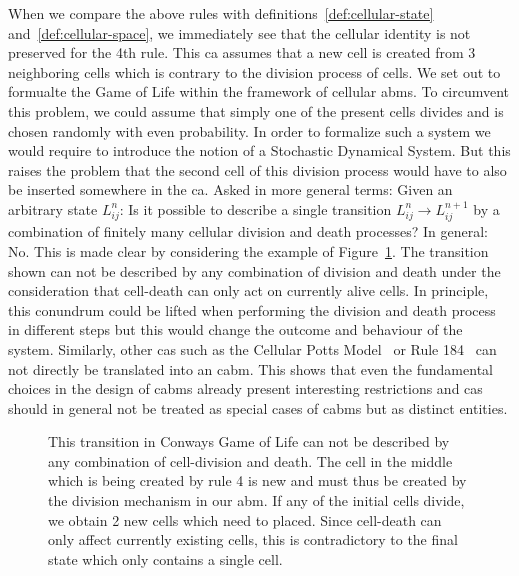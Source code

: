 \documentclass{article}
\begin{document}
When we compare the above rules with definitions~\ref{def:cellular-state}
and~\ref{def:cellular-space}, we immediately see that the cellular identity is not preserved for the
4th rule.
This \ac{ca} assumes that a new cell is created from 3 neighboring cells which is contrary to the
division process of cells.
We set out to formualte the Game of Life within the framework of cellular \acp{abm}.
To circumvent this problem, we could assume that simply one of the present cells divides and is
chosen randomly with even probability.
In order to formalize such a system we would require to introduce the notion of a
Stochastic Dynamical System.
But this raises the problem that the second cell of this division process would have to also be
inserted somewhere in the \ac{ca}.
Asked in more general terms: Given an arbitrary state $L^n_{ij}$:
Is it possible to describe a single transition $L^n_{ij}\rightarrow L^{n+1}_{ij}$ by a combination
of finitely many cellular division and death processes?
In general: No.
This is made clear by considering the example of Figure~\ref{fig:conway-non-abm-transition}.
The transition shown can not be described by any combination of division and death under the
consideration that cell-death can only act on currently alive cells.
In principle, this conundrum could be lifted when performing the division and death process in
different steps but this would change the outcome and behaviour of the system.
Similarly, other \acp{ca} such as the Cellular Potts Model~\cite{Graner1992} or Rule
184~\cite{Krug1988} can not
directly be translated into an \ac{cabm}.
This shows that even the fundamental choices in the design of \acp{cabm} already present interesting
restrictions and \acp{ca} should in general not be treated as special cases of \acp{cabm} but as
distinct entities.

\begin{figure}
    \centering
    \caption{
        This transition in Conways Game of Life can not be described by any combination of
        cell-division and death.
        The cell in the middle which is being created by rule 4 is new and must thus be created by
        the division mechanism in our \ac{abm}.
        If any of the initial cells divide, we obtain 2 new cells which need to placed.
        Since cell-death can only affect currently existing cells, this is contradictory to the
        final state which only contains a single cell.
    }
    \label{fig:conway-non-abm-transition}
\end{figure}
\end{document}
